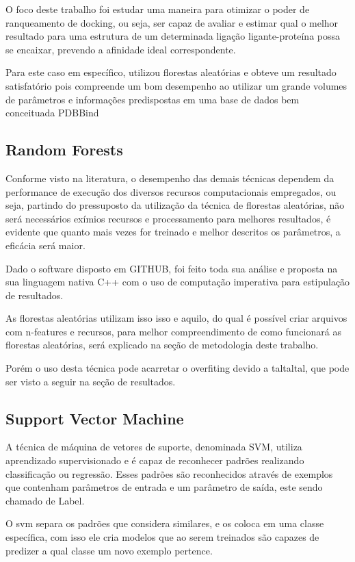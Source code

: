 \documentclass[tcc, capa]{texucpel}
\begin{document}
O foco deste trabalho foi estudar uma maneira para otimizar o poder de ranqueamento de docking, ou seja, ser capaz de avaliar e estimar qual o melhor resultado para uma estrutura de um determinada ligação ligante-proteína possa se encaixar, prevendo a afinidade ideal correspondente.

Para este caso em específico,\textbf{\cite{ballester2010machine}} utilizou florestas aleatórias e obteve um resultado satisfatório pois compreende um bom desempenho ao utilizar um grande volumes de parâmetros e informações predispostas em uma base de dados bem conceituada PDBBind \cite{wang2004pdbbind}

\subsection{Random Forests}
Conforme visto na literatura, o desempenho das demais técnicas dependem da performance de execução dos diversos recursos computacionais empregados, ou seja, partindo do pressuposto da utilização da técnica de florestas aleatórias, não será necessários exímios recursos e processamento para melhores resultados, é evidente que quanto mais vezes for treinado e melhor descritos os parâmetros, a eficácia será maior.

Dado o software disposto em GITHUB, foi feito toda sua análise e proposta na sua linguagem nativa C++ com o uso de computação imperativa para estipulação de resultados.

As florestas aleatórias utilizam isso isso e aquilo, do qual é possível criar arquivos com n-features e recursos, para melhor compreendimento de como funcionará as florestas aleatórias, será explicado na seção de metodologia deste trabalho. 

Porém o uso desta técnica pode acarretar o overfiting devido a taltaltal, que pode ser visto a seguir na seção de resultados.

\subsection{Support Vector Machine}

A técnica de máquina de vetores de suporte, denominada SVM, utiliza aprendizado supervisionado e é capaz de reconhecer padrões realizando classificação ou regressão. Esses padrões são reconhecidos através de exemplos que contenham parâmetros de entrada e um parâmetro de saída, este sendo chamado de Label.

O svm separa os padrões que considera similares, e os coloca em uma classe específica, com isso ele cria modelos que ao serem treinados são capazes de predizer a qual classe um novo exemplo pertence.\cite{boser1992training}
\end{document}
